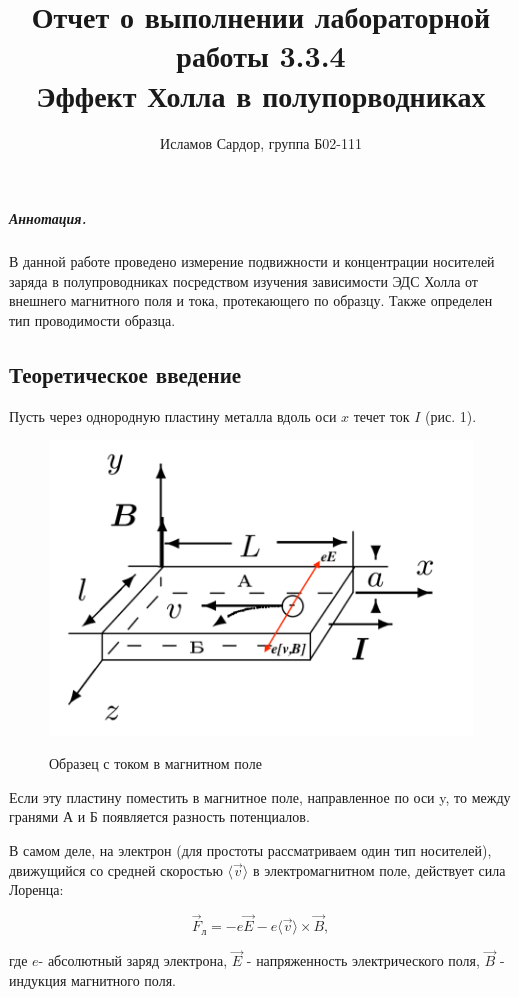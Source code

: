 \documentclass[12pt,a4paper]{article}
\title{
Отчет о выполнении лабораторной работы 3.3.4 \\
Эффект Холла в полупорводниках}
\author{Исламов Сардор, группа Б02-111}
\begin{document}
\maketitle

\subparagraph*{Аннотация.} 
В данной работе проведено измерение подвижности и концентрации носителей заряда в полупроводниках посредством изучения зависимости ЭДС Холла от внешнего магнитного поля и тока, протекающего по образцу.
Также определен тип проводимости образца. 

\subsection*{Теоретическое введение}
Пусть через однородную пластину металла вдоль оси $x$ течет ток $I$ (рис. 1).
	
	\begin{figure}
		\vspace{-20pt}
		\begin{center}
			\includegraphics[width=0.7\linewidth]{Holl1.png}
			\label{fig:sdfsafd}
		\end{center}
		\vspace{-20pt}
		\caption{Образец с током в магнитном поле}
	\end{figure}

	Если эту пластину поместить в магнитное поле, направленное по оси y, то между гранями А и Б появляется разность потенциалов. 
	
	В самом деле, на электрон (для простоты рассматриваем один тип носителей), движущийся со средней скоростью $\langle \vec{v} \rangle$ в электромагнитном поле, действует сила Лоренца:
	
	$$\vec{F}_{л} = -e\vec{E}-e \langle \vec{v} \rangle \times \vec{B},$$
	
	где $e$- абсолютный заряд электрона, $\vec{E}$ - напряженность электрического поля, $\vec{B}$ - индукция магнитного поля.
	
\end{document}
